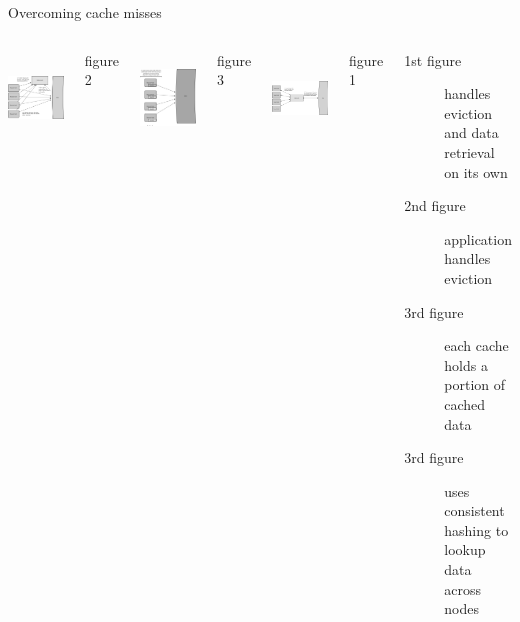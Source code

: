 \documentclass[9pt]{beamer}
\begin{document}
\begin{frame}{Overcoming cache misses}
  \begin{columns}
    \includegraphics[width=50mm, height=25mm, scale=0.1]{img/global_cache2.png}
    \caption{figure 2}
    \includegraphics[width=50mm, height=25mm, scale=0.1]{img/dist_cache.png}
    \caption{figure 3}

    \includegraphics[width=50mm, height=25mm, scale=0.1]{img/global_cache.png}
    \caption{figure 1}
    \begin{description}
    \item[1st figure] handles eviction and data retrieval on its own
    \item[2nd figure] application handles eviction
    \item[3rd figure] each cache holds a portion of cached data
    \item[3rd figure] uses consistent hashing to lookup data across nodes
    \end{description}
  \end{columns}
\end{frame}
\end{document}
